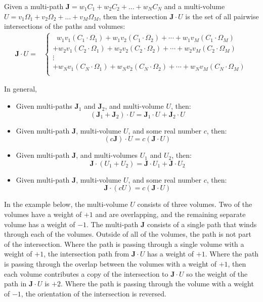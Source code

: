 \documentclass{book}
\begin{document}
Given a multi-path \(\mathbf{J} = w_1 C_1 + w_2 C_2 + ... + w_N C_N\) and a multi-volume \\ \(U = v_1 \Omega_1 + v_2\Omega_2 + ... + v_M\Omega_M\), then the intersection \(\mathbf{J} \cdot U\) is the set of all pairwise intersections of the paths and volumes:
\begin{align*}
\mathbf{J} \cdot U = & \left\{\begin{array}{c}
\;\; w_1 v_1 (C_1 \cdot \Omega_1) + w_1 v_2 (C_1 \cdot \Omega_2) + \cdots + w_1 v_M (C_1 \cdot \Omega_M) \\ 
+ w_2 v_1 (C_2 \cdot \Omega_1) + w_2 v_2 (C_2 \cdot \Omega_2) + \cdots + w_2 v_M (C_2 \cdot \Omega_M) \\ 
\vdots \\
+ w_N v_1 (C_N \cdot \Omega_1) + w_N v_2 (C_N \cdot \Omega_2) + \cdots + w_N v_M (C_N \cdot \Omega_M) \\ 
\end{array}\right.
\end{align*}

In general,
\begin{itemize}
\item Given multi-paths \(\mathbf{J}_1\) and \(\mathbf{J}_2\), and multi-volume \(U\), then:
\[(\mathbf{J}_1 + \mathbf{J}_2) \cdot U = \mathbf{J}_1 \cdot U + \mathbf{J}_2 \cdot U\] 
\item Given multi-path \(\mathbf{J}\), multi-volume \(U\), and some real number \(c\), then:
\[(c\mathbf{J}) \cdot U = c(\mathbf{J} \cdot U)\]
\item Given multi-path \(\mathbf{J}\), and multi-volumes \(U_1\) and \(U_2\), then:
\[\mathbf{J} \cdot (U_1 + U_2) = \mathbf{J} \cdot U_1 + \mathbf{J} \cdot U_2\] 
\item Given multi-path \(\mathbf{J}\), multi-volume \(U\), and some real number \(c\), then:
\[\mathbf{J} \cdot (cU) = c(\mathbf{J} \cdot U)\]
\end{itemize}

In the example below, the multi-volume \(U\) consists of three volumes. Two of the volumes have a weight of \(+1\) and are overlapping, and the remaining separate volume has a weight of \(-1\). The multi-path \(\mathbf{J}\) consists of a single path that winds through each of the volumes. Outside of all of the volumes, the path is not part of the intersection. Where the path is passing through a single volume with a weight of \(+1\), the intersection path from \(\mathbf{J} \cdot U\) has a weight of \(+1\). Where the path is passing through the overlap between the volumes with a weight of \(+1\), then each volume contributes a copy of the intersection to \(\mathbf{J} \cdot U\) so the weight of the path in \(\mathbf{J} \cdot U\) is \(+2\). Where the path is passing through the volume with a weight of \(-1\), the orientation of the intersection is reversed.  
\end{document}
